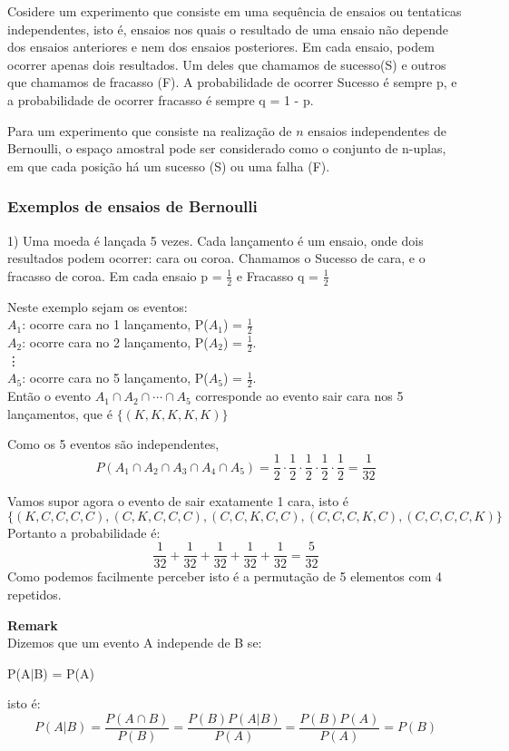 \documentclass[10pt,a4paper]{article}
\begin{document}
Cosidere um experimento que consiste em uma sequência de ensaios ou tentaticas independentes, isto é, ensaios nos quais o resultado de uma ensaio não depende dos ensaios anteriores e nem dos ensaios posteriores. Em cada ensaio, podem ocorrer apenas dois resultados. Um deles que chamamos de sucesso(S) e outros que chamamos de fracasso (F). A probabilidade de ocorrer Sucesso é sempre p, e a probabilidade de ocorrer fracasso é sempre q = 1 - p.


Para um experimento que consiste na realização de $ n $ ensaios independentes de Bernoulli, o espaço amostral pode ser considerado como o conjunto de n-uplas, em que cada posição há um sucesso (S) ou uma falha (F).
\subsubsection{Exemplos de ensaios de Bernoulli}


1) Uma moeda é lançada 5 vezes. Cada lançamento é um ensaio, onde dois resultados podem ocorrer: cara ou coroa. Chamamos o Sucesso de cara, e o fracasso de coroa. Em cada ensaio p = $\frac{1}{2}$ e Fracasso q = $\frac{1}{2}$


Neste exemplo sejam os eventos:\\
$A_{1}$: ocorre cara no 1 lançamento, P($A_{1}$) = $\frac{1}{2}$\\
$A_{2}$: ocorre cara no 2 lançamento, P($A_{2}$) = $\frac{1}{2}$.\\
\vdots\\
$A_{5}$: ocorre cara no 5 lançamento, P($A_{5}$) = $\frac{1}{2}$.\\


Então o evento $A_{1} \cap A_{2} \cap \cdots \cap A_{5}$ corresponde ao evento sair cara nos 5 lançamentos, que é $\lbrace(K, K, K, K, K) \rbrace$

Como os 5 eventos são independentes, \\
\[P(A_{1} \cap A_{2} \cap A_{3} \cap A_{4} \cap A_{5}) = \frac{1}{2} \cdot \frac{1}{2}\cdot \frac{1}{2} \cdot \frac{1}{2} \cdot \frac{1}{2} = \frac{1}{32}\] 

Vamos supor agora o evento de sair exatamente 1 cara, isto é
\[\lbrace(K, C, C, C, C), (C, K, C, C, C), (C, C, K, C, C), (C, C, C, K, C), (C, C, C, C, K) \rbrace\]
Portanto a probabilidade é:
\[\frac{1}{32} + \frac{1}{32} + \frac{1}{32} + \frac{1}{32} + \frac{1}{32} = \frac{5}{32}\]
Como podemos facilmente perceber isto é a permutação de 5 elementos com 4 repetidos.
\begin{mdframed}[linewidth=0.6pt]
	\textbf{Remark}\\
	Dizemos que um evento A independe de B se:
	\begin{center}
		P(A$|$B) = P(A)
	\end{center}
	isto é:
	\[P(A|B) = \frac{P(A \cap B)}{P(B)} = \frac{P(B) P(A|B)}{P(A)} = \frac{P(B)P(A)}{P(A)} = 
	P(B)\]
\end{mdframed}
\end{document}

